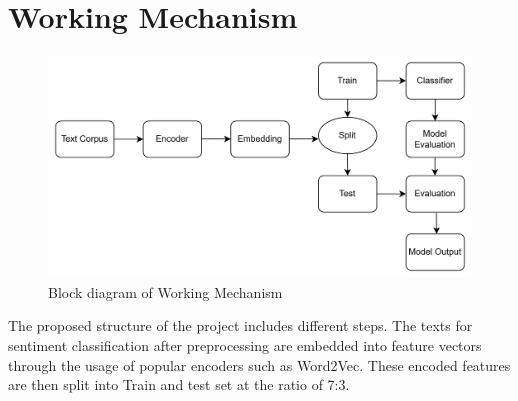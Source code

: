 \section{Working Mechanism}

\begin{figure}[h]
\centering
\includegraphics[scale=0.23]{images/methodology.png}
\caption{Block diagram of Working Mechanism}
\end{figure}
The proposed structure of the project includes different steps. The texts for sentiment classification after preprocessing are embedded into feature vectors through the usage of popular encoders such as Word2Vec. These encoded features are then split into Train and test set at the ratio of 7:3.
